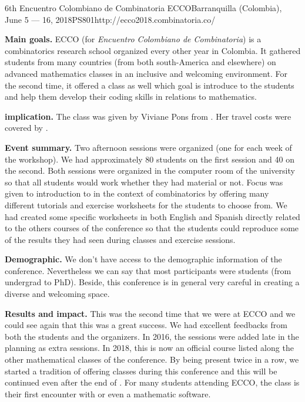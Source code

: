 \begin{event}{6th Encuentro Colombiano de Combinatoria }{ECCO}{Barranquilla (Colombia), June 5 --- 16, 2018}{PS}{80}{1}{http://ecco2018.combinatoria.co/}

\textbf{Main goals.} ECCO (for \textit{Encuentro Colombiano de Combinatoria}) is a combinatorics research school organized every other year in Colombia. It gathered students from many countries (from both south-America and elsewhere) on advanced mathematics classes in an inclusive and welcoming environment. For the second time, it offered a \Sage class as well which goal is introduce \Sage to the students and help them develop their coding skills in relations to mathematics.

\textbf{\ODK implication.} The \Sage class was given by Viviane Pons from \ODK. Her travel costs were covered by \ODK.

\textbf{Event summary.} Two afternoon sessions were organized (one for each week of the workshop). We had approximately 80 students on the first session and 40 on the second. Both sessions were organized in the computer room of the university so that all students would work whether they had material or not. Focus was given to introduction to \Sage in the context of combinatorics by offering many different tutorials and exercise worksheets for the students to choose from. We had created some specific worksheets in both English and Spanish directly related to the others courses of the conference so that the students could reproduce some of the results they had seen during classes and exercise sessions.

\textbf{Demographic.} We don't have access to the demographic information of the conference. Nevertheless we can say that most participants were students (from undergrad to PhD). Beside, this conference is in general very careful in creating a diverse and welcoming space.

\textbf{Results and impact.} This was the second time that we were at ECCO and we could see again that this was a great success. We had excellent feedbacks from both the students and the organizers. In 2016, the \Sage sessions were added late in the planning as extra sessions. In 2018, this is now an official \Sage course listed along the other mathematical classes of the conference. By being present twice in a row, we started a tradition of offering \Sage classes during this conference and this will be continued even after the end of \ODK. For many students attending ECCO, the \Sage class is their first encounter with \Sage or even a mathematic software.


\end{event}

